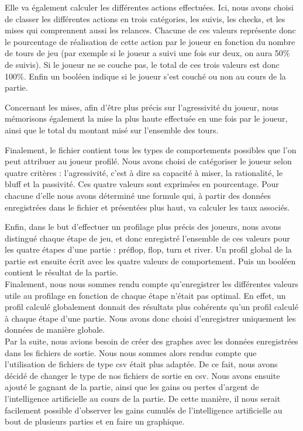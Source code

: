 \documentclass{report}
\begin{document}
Elle va également calculer les différentes actions effectuées. Ici, nous avons choisi de classer les différentes actions en trois catégories, les suivis, les checks, et les mises qui comprennent aussi les relances. Chacune de ces valeurs représente donc le pourcentage de réalisation de cette action par le joueur en fonction du nombre de tours de jeu (par exemple si le joueur a suivi une fois sur deux, on aura 50\% de suivis). Si le joueur ne se couche pas, le total de ces trois valeurs est donc 100\%. Enfin un booléen indique si le joueur s'est couché ou non au cours de la partie.\par
Concernant les mises, afin d'être plus précis sur l'agressivité du joueur, nous mémorisons également la mise la plus haute effectuée en une fois par le joueur, ainsi que le total du montant misé sur l'ensemble des tours.\par
Finalement, le fichier contient tous les types de comportements possibles que l'on peut attribuer au joueur profilé. Nous avons choisi de catégoriser le joueur selon quatre critères : l'agressivité, c'est à dire sa capacité à miser, la rationalité, le bluff et la passivité. Ces quatre valeurs sont exprimées en pourcentage. Pour chacune d'elle nous avons déterminé une formule qui, à partir des données enregistrées dans le fichier et présentées plus haut, va calculer les taux associés.\par
Enfin, dans le but d'effectuer un profilage plus précis des joueurs, nous avons distingué chaque étape de jeu, et donc enregistré l'ensemble de ces valeurs pour les quatre étapes d'une partie : préflop, flop, turn et river. Un profil global de la partie est ensuite écrit avec les quatre valeurs de comportement. Puis un booléen contient le résultat de la partie.\\

Finalement, nous nous sommes rendu compte qu'enregistrer les différentes valeurs utile au profilage en fonction de chaque étape n'était pas optimal. En effet, un profil calculé globalement donnait des résultats plus cohérents qu'un profil calculé à chaque étape d'une partie. Nous avons donc choisi d'enregistrer uniquement les données de manière globale.\\


Par la suite, nous avions besoin de créer des graphes avec les données enregistrées dans les fichiers de sortie. Nous nous sommes alors rendus compte que l'utilisation de fichiers de type csv était plus adaptée. De ce fait, nous avons décidé de changer le type de nos fichiers de sortie en csv.
Nous avons ensuite ajouté le gagnant de la partie, ainsi que les gains ou pertes d'argent de l'intelligence artificielle au cours de la partie. De cette manière, il nous serait facilement possible d'observer les gains cumulés de l'intelligence artificielle au bout de plusieurs parties et en faire un graphique.\par
\end{document}
